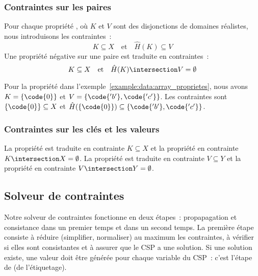 \subsubsection{Contraintes sur les paires}

Pour chaque propriété , où $K$ et $V$ sont des disjonctions de
domaines réalistes, nous introduisons les contraintes~:
%
$$K \subseteq X \quad\mathrm{et}\quad \hat{H}(K) \subseteq V$$
%
Une propriété négative sur une paire  est traduite en
contraintes~:
%
$$K \subseteq X \quad\mathrm{et}\quad \hat{H}(K) \intersection V = \emptyset$$

Pour la propriété  dans
l'exemple~\ref{example:data:array_proprietes}, nous avons $K = \{\code{0}\}$ et
$V = \{\code{'b'}, \code{'c'}\}$. Les contraintes sont $\{\code{0}\} \subseteq
X$ et $\hat{H}(\{\code{0}\}) \subseteq \{\code{'b'}, \code{'c'}\}$.

\subsubsection{Contraintes sur les clés et les valeurs}

La propriété  est traduite en contrainte $K \subseteq X$ et la
propriété  en contrainte $K \intersection X = \emptyset$. La
propriété  est traduite en contrainte $V \subseteq Y$ et la
propriété  en contrainte $V \intersection Y = \emptyset$.

\subsection{Solveur de contraintes}
\label{subsection:data:solver}

Notre solveur de contraintes fonctionne en deux étapes~: propapagation et
consistance dans un premier temps et  dans un second temps.
La première étape consiste à réduire (simplifier, normaliser) au maximum les
contraintes, à vérifier si elles sont consistantes et à assurer que le CSP
a une solution. Si une solution existe, une valeur doit être générée pour chaque
variable du CSP~: c'est l'étape de  (de l'étiquetage).

